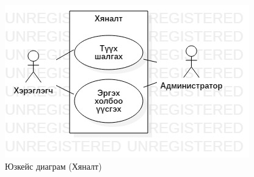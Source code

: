 \begin{figure}[htbp]
	\centering
	\includegraphics[scale=0.4]{Diagrams/UseCaseMonitor}
	\caption[Юзкейс диаграм]{Юзкейс диаграм (Хяналт)}
	\label{fit:UseCase}
\end{figure}
